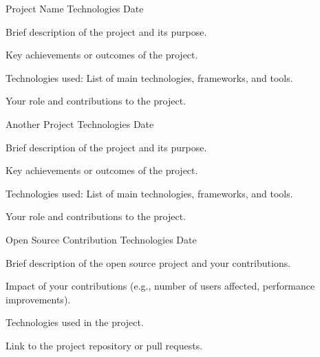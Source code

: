
\begin{cventries}
    \cventry
    {Project Name} %
    {Technologies} %
    {Date} %
    {} %
    {
      \begin{cvitems} %
        \item {Brief description of the project and its purpose.}
        \item {Key achievements or outcomes of the project.}
        \item {Technologies used: List of main technologies, frameworks, and tools.}
        \item {Your role and contributions to the project.}
      \end{cvitems}
    }

    \cventry
    {Another Project} %
    {Technologies} %
    {Date} %
    {} %
    {
      \begin{cvitems} %
        \item {Brief description of the project and its purpose.}
        \item {Key achievements or outcomes of the project.}
        \item {Technologies used: List of main technologies, frameworks, and tools.}
        \item {Your role and contributions to the project.}
      \end{cvitems}
    }

    \cventry
    {Open Source Contribution} %
    {Technologies} %
    {Date} %
    {} %
    {
      \begin{cvitems} %
        \item {Brief description of the open source project and your contributions.}
        \item {Impact of your contributions (e.g., number of users affected, performance improvements).}
        \item {Technologies used in the project.}
        \item {Link to the project repository or pull requests.}
      \end{cvitems}
    }
\end{cventries}
